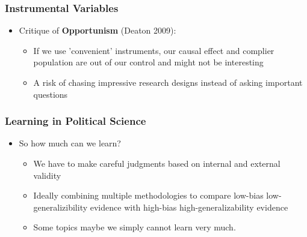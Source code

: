 \documentclass[xcolor=x11names,compress]{beamer}\usepackage[]{graphicx}\usepackage[]{color}
\renewcommand{\(}{\begin{columns}}
\renewcommand{\)}{\end{columns}}
\newcommand{\<}[1]{\begin{column}{#1}}
\renewcommand{\>}{\end{column}}
\begin{document}
\begin{frame}
\frametitle{Instrumental Variables}
\begin{itemize}
\item Critique of \textbf{Opportunism} (Deaton 2009):
\pause
\begin{itemize}
\item If we use 'convenient' instruments, our causal effect and complier population are out of our control and might not be interesting
\pause
\item A risk of chasing impressive research designs instead of asking important questions
\end{itemize}
\end{itemize}
\end{frame}

\begin{frame}
\frametitle{Learning in Political Science}
\begin{itemize}
\item So how much can we learn?
\pause
\begin{itemize}
\item We have to make careful judgments based on internal and external validity
\pause
\item Ideally combining multiple methodologies to compare low-bias low-generalizibility evidence with high-bias high-generalizability evidence
\pause
\item Some topics maybe we simply cannot learn very much.
\end{itemize}
\end{itemize}
\end{frame} 
\end{document}
